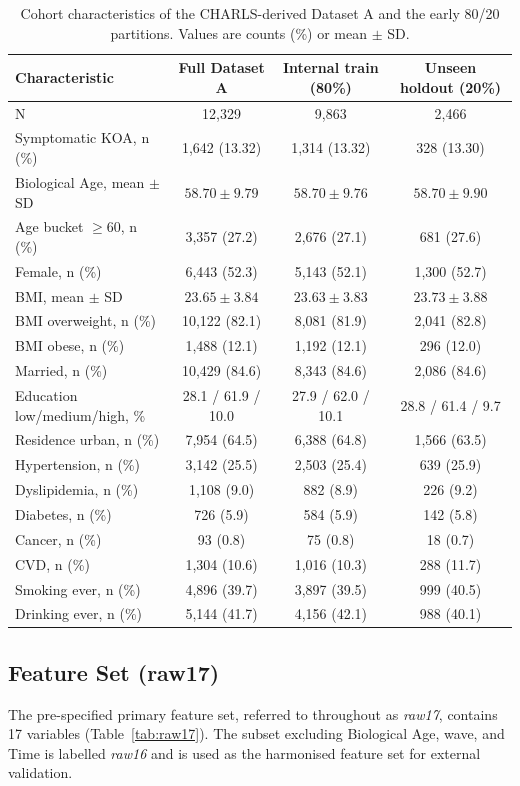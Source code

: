 \documentclass[11pt,a4paper]{article}
\begin{document}
\begin{table}[h!]
\centering
\small
\caption{Cohort characteristics of the CHARLS-derived Dataset A and the early 80/20 partitions.
Values are counts (\%) or mean $\pm$ SD.}
\label{tab:table1}
\begin{tabular}{lccc}
\toprule
Characteristic & Full Dataset A & Internal train (80\%) & Unseen holdout (20\%) \\
\midrule
N & 12{,}329 & 9{,}863 & 2{,}466 \\
Symptomatic KOA, n (\%) & 1{,}642 (13.32) & 1{,}314 (13.32) & 328 (13.30) \\
Biological Age, mean $\pm$ SD & $58.70 \pm 9.79$ & $58.70 \pm 9.76$ & $58.70 \pm 9.90$ \\
Age bucket $\geq 60$, n (\%) & 3{,}357 (27.2) & 2{,}676 (27.1) & 681 (27.6) \\
Female, n (\%) & 6{,}443 (52.3) & 5{,}143 (52.1) & 1{,}300 (52.7) \\
BMI, mean $\pm$ SD & $23.65 \pm 3.84$ & $23.63 \pm 3.83$ & $23.73 \pm 3.88$ \\
BMI overweight, n (\%) & 10{,}122 (82.1) & 8{,}081 (81.9) & 2{,}041 (82.8) \\
BMI obese, n (\%) & 1{,}488 (12.1) & 1{,}192 (12.1) & 296 (12.0) \\
Married, n (\%) & 10{,}429 (84.6) & 8{,}343 (84.6) & 2{,}086 (84.6) \\
Education low/medium/high, \% & 28.1 / 61.9 / 10.0 & 27.9 / 62.0 / 10.1 & 28.8 / 61.4 / 9.7 \\
Residence urban, n (\%) & 7{,}954 (64.5) & 6{,}388 (64.8) & 1{,}566 (63.5) \\
Hypertension, n (\%) & 3{,}142 (25.5) & 2{,}503 (25.4) & 639 (25.9) \\
Dyslipidemia, n (\%) & 1{,}108 (9.0) & 882 (8.9) & 226 (9.2) \\
Diabetes, n (\%) & 726 (5.9) & 584 (5.9) & 142 (5.8) \\
Cancer, n (\%) & 93 (0.8) & 75 (0.8) & 18 (0.7) \\
CVD, n (\%) & 1{,}304 (10.6) & 1{,}016 (10.3) & 288 (11.7) \\
Smoking ever, n (\%) & 4{,}896 (39.7) & 3{,}897 (39.5) & 999 (40.5) \\
Drinking ever, n (\%) & 5{,}144 (41.7) & 4{,}156 (42.1) & 988 (40.1) \\
\bottomrule
\end{tabular}
\end{table}

\subsection{Feature Set (raw17)}
The pre-specified primary feature set, referred to throughout as \emph{raw17}, contains 17 variables
(Table~\ref{tab:raw17}). The subset excluding Biological Age, wave, and Time is labelled \emph{raw16}
and is used as the harmonised feature set for external validation.
\end{document}
